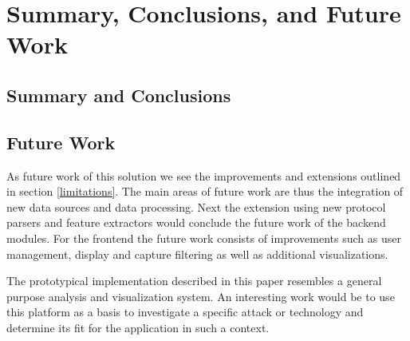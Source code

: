 \chapter{Summary, Conclusions, and Future Work} %
\section{Summary and Conclusions}
\section{Future Work}
As future work of this solution we see the improvements and extensions outlined in section \ref{limitations}. The main areas of future work are thus the integration of new data sources and data processing. Next the extension using new protocol parsers and feature extractors would conclude the future work of the backend modules. For the frontend the future work consists of improvements such as user management, display and capture filtering as well as additional visualizations.

The prototypical implementation described in this paper resembles a general purpose analysis and visualization system. An interesting work would be to use this platform as a basis to investigate a specific attack or technology and determine its fit for the application in such a context.
